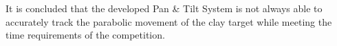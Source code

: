 It is concluded that the developed Pan \& Tilt System
is not always able to accurately track the parabolic movement of the clay target while
meeting the time requirements of the competition.

